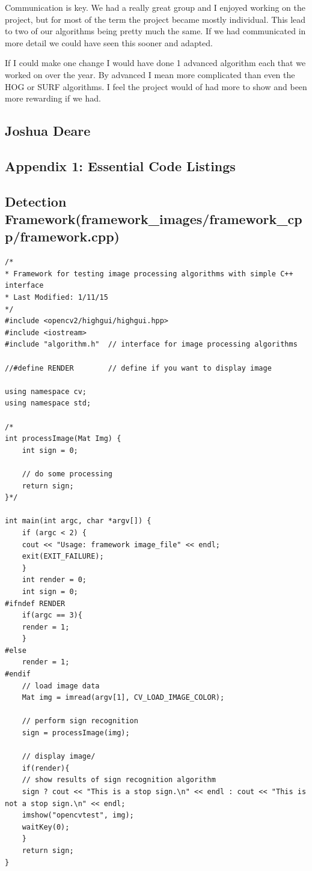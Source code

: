 \documentclass[letterpaper,10pt,titlepage]{article}
\begin{document}
Communication is key. We had a really great group and I enjoyed working on the
project, but for most of the term the project became mostly individual. This lead
to two of our algorithms being pretty much the same. If we had communicated in 
more detail we could have seen this sooner and adapted.


If I could make one change I would have done 1 advanced algorithm each that we worked on over the year.
By advanced I mean more complicated than even the HOG or SURF algorithms. I feel
the project would of had more to show and been more rewarding if we had.

\subsection*{Joshua Deare}
\newpage

\vspace*{\fill}
\begin{center}
\begin{minipage}{.6\textwidth}
\section*{Appendix 1: Essential Code Listings}
\end{minipage}
\end{center}
\vfill

\newpage
\subsection*{Detection Framework(framework\_images/framework\_cpp/framework.cpp)}
\begin{lstlisting}
/*
* Framework for testing image processing algorithms with simple C++ interface
* Last Modified: 1/11/15
*/
#include <opencv2/highgui/highgui.hpp>
#include <iostream>
#include "algorithm.h"	// interface for image processing algorithms

//#define RENDER		// define if you want to display image

using namespace cv;
using namespace std;

/*
int processImage(Mat Img) {
	int sign = 0;

	// do some processing
	return sign;
}*/

int main(int argc, char *argv[]) {
    if (argc < 2) {
	cout << "Usage: framework image_file" << endl;
	exit(EXIT_FAILURE);
    }
    int render = 0;
    int sign = 0;
#ifndef RENDER
    if(argc == 3){
	render = 1;
    }
#else
    render = 1;
#endif
    // load image data  
    Mat img = imread(argv[1], CV_LOAD_IMAGE_COLOR);

    // perform sign recognition
    sign = processImage(img);
    
    // display image/
    if(render){
	// show results of sign recognition algorithm
	sign ? cout << "This is a stop sign.\n" << endl : cout << "This is not a stop sign.\n" << endl;
	imshow("opencvtest", img);
	waitKey(0);
    }
    return sign;
}

\end{lstlisting}
\end{document}
